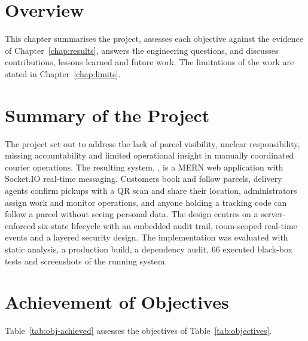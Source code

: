 \section{Overview}

This chapter summarises the project, assesses each objective against the evidence of Chapter~\ref{chap:results}, answers the engineering questions, and discusses contributions, lessons learned and future work. The limitations of the work are stated in Chapter~\ref{chap:limits}.

\section{Summary of the Project}

The project set out to address the lack of parcel visibility, unclear responsibility, missing accountability and limited operational insight in manually coordinated courier operations. The resulting system, \scpms, is a MERN web application with Socket.IO real-time messaging. Customers book and follow parcels, delivery agents confirm pickups with a QR scan and share their location, administrators assign work and monitor operations, and anyone holding a tracking code can follow a parcel without seeing personal data. The design centres on a server-enforced six-state lifecycle with an embedded audit trail, room-scoped real-time events and a layered security design. The implementation was evaluated with static analysis, a production build, a dependency audit, 66 executed black-box tests and screenshots of the running system.

\section{Achievement of Objectives}

Table~\ref{tab:obj-achieved} assesses the objectives of Table~\ref{tab:objectives}.

